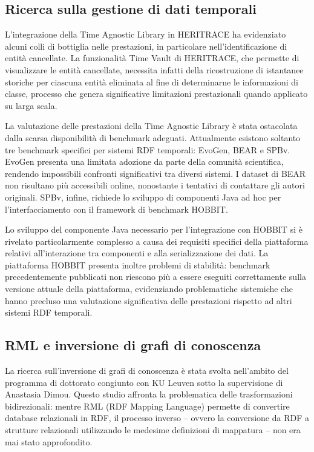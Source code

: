 \documentclass[11pt,a4paper]{article}
\begin{document}
\subsection{Ricerca sulla gestione di dati temporali}

L'integrazione della Time Agnostic Library in HERITRACE ha evidenziato alcuni colli di bottiglia nelle prestazioni, in particolare nell'identificazione di entità cancellate. La funzionalità Time Vault di HERITRACE, che permette di visualizzare le entità cancellate, necessita infatti della ricostruzione di istantanee storiche per ciascuna entità eliminata al fine di determinarne le informazioni di classe, processo che genera significative limitazioni prestazionali quando applicato su larga scala.

La valutazione delle prestazioni della Time Agnostic Library è stata ostacolata dalla scarsa disponibilità di benchmark adeguati. Attualmente esistono soltanto tre benchmark specifici per sistemi RDF temporali: EvoGen, BEAR e SPBv. EvoGen presenta una limitata adozione da parte della comunità scientifica, rendendo impossibili confronti significativi tra diversi sistemi. I dataset di BEAR non risultano più accessibili online, nonostante i tentativi di contattare gli autori originali. SPBv, infine, richiede lo sviluppo di componenti Java ad hoc per l'interfacciamento con il framework di benchmark HOBBIT.

Lo sviluppo del componente Java necessario per l'integrazione con HOBBIT si è rivelato particolarmente complesso a causa dei requisiti specifici della piattaforma relativi all'interazione tra componenti e alla serializzazione dei dati. La piattaforma HOBBIT presenta inoltre problemi di stabilità: benchmark precedentemente pubblicati non riescono più a essere eseguiti correttamente sulla versione attuale della piattaforma, evidenziando problematiche sistemiche che hanno precluso una valutazione significativa delle prestazioni rispetto ad altri sistemi RDF temporali.

\subsection{RML e inversione di grafi di conoscenza}

La ricerca sull'inversione di grafi di conoscenza è stata svolta nell'ambito del programma di dottorato congiunto con KU Leuven sotto la supervisione di Anastasia Dimou. Questo studio affronta la problematica delle trasformazioni bidirezionali: mentre RML (RDF Mapping Language) permette di convertire database relazionali in RDF, il processo inverso – ovvero la conversione da RDF a strutture relazionali utilizzando le medesime definizioni di mappatura – non era mai stato approfondito.
\end{document}

